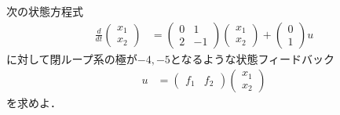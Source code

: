 \documentclass[a4paper,11pt,fleqn]{jreport}
\begin{document}
次の状態方程式
\begin{align*}
	\frac{d}{dt}
	\left (
	\begin{array}{c}
	 x_1 \\ x_2 
	\end{array}
	\right )
	& = 
	\left (
	\begin{array}{cc}
	 0 & 1 \\
	 2 & -1
	\end{array}
	\right )
	\left (
	\begin{array}{c}
	 x_1 \\ x_2 
	\end{array}
	\right )
	+
	\left (
	\begin{array}{c}
	 0 \\ 1 
	\end{array}
	\right )
	u
\end{align*}
に対して閉ループ系の極が$-4,-5$となるような状態フィードバック
\begin{align*}
	u 
	&=
	\left (
	\begin{array}{cc}
	 f_1 & f_2
	\end{array}
	\right )
	\left (
	\begin{array}{c}
	 x_1 \\ x_2 
	\end{array}
	\right )
\end{align*}
を求めよ．
\\
\end{document}
